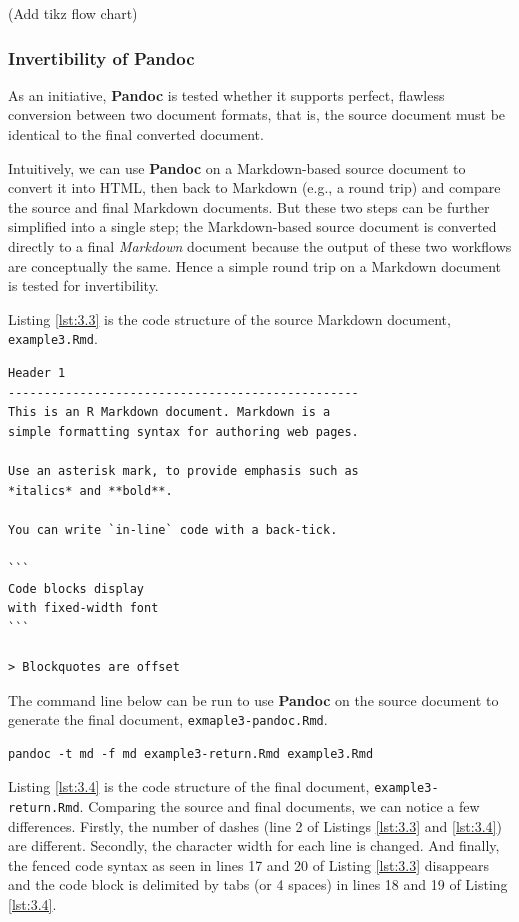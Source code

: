 \documentclass[a4paper, 12pt]{report}
\begin{document}
(Add tikz flow chart)

\subsubsection*{Invertibility of \textbf{Pandoc}}
As an initiative, \textbf{Pandoc} is tested whether it supports perfect, flawless conversion between two document formats, that is, the source document must be identical to the final converted document.

Intuitively, we can use \textbf{Pandoc} on a Markdown-based source document to convert it into HTML, then back to Markdown (e.g., a round trip) and compare the source and final Markdown documents. But these two steps can be further simplified into a single step; the Markdown-based source document is converted directly to a final \emph{Markdown} document because the output of these two workflows are conceptually the same. Hence a simple round trip on a Markdown document is tested for invertibility.

Listing \ref{lst:3.3} is the code structure of the source Markdown document, \texttt{example3.Rmd}.

\begin{lstlisting}[caption={\texttt{example3.Rmd}}, escapechar=\|, label={lst:3.3}]
Header 1
-------------------------------------------------
This is an R Markdown document. Markdown is a
simple formatting syntax for authoring web pages.

Use an asterisk mark, to provide emphasis such as
*italics* and **bold**.

You can write `in-line` code with a back-tick.

```
Code blocks display
with fixed-width font
```

> Blockquotes are offset
\end{lstlisting}

The command line below can be run to use \textbf{Pandoc} on the source document to generate the final document, \texttt{exmaple3-pandoc.Rmd}.

\begin{lstlisting}[numbers=none]
pandoc -t md -f md example3-return.Rmd example3.Rmd
\end{lstlisting}

Listing \ref{lst:3.4} is the code structure of the final document, \texttt{example3-return.Rmd}. Comparing the source and final documents, we can notice a few differences. Firstly, the number of dashes (line 2 of Listings \ref{lst:3.3} and \ref{lst:3.4}) are different. Secondly, the character width for each line is changed. And finally, the fenced code syntax as seen in lines 17 and 20 of Listing \ref{lst:3.3} disappears and the code block is delimited by tabs (or 4 spaces) in lines 18 and 19 of Listing \ref{lst:3.4}.
\end{document}
